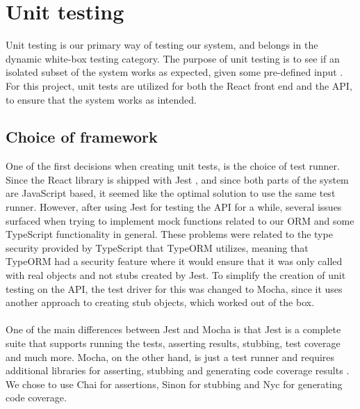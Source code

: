\section{Unit testing}
Unit testing is our primary way of testing our system, and belongs in the dynamic white-box testing category.
The purpose of unit testing is to see if an isolated subset of the system works as expected, given some pre-defined input \cite{TestDrivenDevelopment}.
For this project, unit tests are utilized for both the React front end and the API, to ensure that the system works as intended.

\subsection{Choice of framework}
One of the first decisions when creating unit tests, is the choice of test runner.
Since the React library is shipped with Jest \cite{ReactRunningTests}, and since both parts of the system are JavaScript based, it seemed like the optimal solution to use the same test runner.
However, after using Jest for testing the API for a while, several issues surfaced when trying to implement mock functions related to our ORM and some TypeScript functionality in general.
These problems were related to the type security provided by TypeScript that TypeORM utilizes, meaning that TypeORM had a security feature where it would ensure that it was only called with real objects and not stubs created by Jest.
To simplify the creation of unit testing on the API, the test driver for this was changed to Mocha, since it uses another approach to creating stub objects, which worked out of the box.
\\\\
One of the main differences between Jest and Mocha is that Jest is a complete suite that supports running the tests, asserting results, stubbing, test coverage and much more.
Mocha, on the other hand, is just a test runner and requires additional libraries for asserting, stubbing and generating code coverage results \cite{Mocha}.
We chose to use Chai for assertions, Sinon for stubbing and Nyc for generating code coverage.

